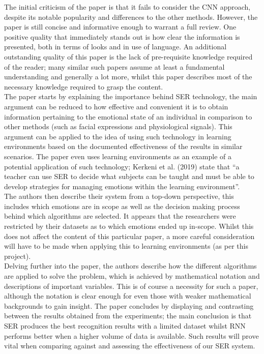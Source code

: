 \documentclass[12pt]{article}
\begin{document}
\noindent The initial criticism of the paper is that it fails to consider the CNN approach, despite its notable popularity and differences to the other methods. However, the paper is still concise and informative enough to warrant a full review. One positive quality that immediately stands out is how clear the information is presented, both in terms of looks and in use of language. An additional outstanding quality of this paper is the lack of pre-requisite knowledge required of the reader; many similar such papers assume at least a fundamental understanding and generally a lot more, whilst this paper describes most of the necessary knowledge required to grasp the content.
\\

\noindent The paper starts by explaining the importance behind SER technology, the main argument can be reduced to how effective and convenient it is to obtain information pertaining to the emotional state of an individual in comparison to other methods (such as facial expressions and physiological signals). This argument can be applied to the idea of using such technology in learning environments based on the documented effectiveness of the results in similar scenarios. The paper even uses learning environments as an example of a potential application of such technology; Kerkeni et al. (2019) state that ``a teacher can use SER to decide what subjects can be taught and must be able to develop strategies for managing emotions within the learning environment''.
\\

\noindent The authors then describe their system from a top-down perspective, this includes which emotions are in scope as well as the decision making process behind which algorithms are selected. It appears that the researchers were restricted by their datasets as to which emotions ended up in-scope. Whilst this does not affect the content of this particular paper, a more careful consideration will have to be made when applying this to learning environments (as per this project).
\\

\noindent Delving further into the paper, the authors describe how the different algorithms are applied to solve the problem, which is achieved by mathematical notation and descriptions of important variables. This is of course a necessity for such a paper, although the notation is clear enough for even those with weaker mathematical backgrounds to gain insight. The paper concludes by displaying and contrasting between the results obtained from the experiments; the main conclusion is that SER produces the best recognition results with a limited dataset whilst RNN performs better when a higher volume of data is available. Such results will prove vital when comparing against and assessing the effectiveness of our SER system.
\end{document}
